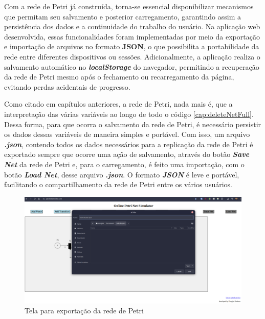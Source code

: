 \documentclass[
	12pt,				%
	openright,			%
	oneside,			%
	a4paper,			%
	english,			%
	brazil				%
	]{abntex2}
\begin{document}
Com a rede de Petri já construída, torna-se essencial disponibilizar mecanismos que permitam seu salvamento e posterior carregamento, garantindo assim a persistência dos dados e a continuidade do trabalho do usuário. Na aplicação web desenvolvida, essas funcionalidades foram implementadas por meio da exportação e importação de arquivos no formato \textbf{JSON}, o que possibilita a portabilidade da rede entre diferentes dispositivos ou sessões. Adicionalmente, a aplicação realiza o salvamento automático no \textbf{\textit{localStorage}} do navegador, permitindo a recuperação da rede de Petri mesmo após o fechamento ou recarregamento da página, evitando perdas acidentais de progresso.

Como citado em capítulos anteriores, a rede de Petri, nada mais é, que a interpretação das várias variáveis ao longo de todo o código \ref{cap:deleteNetFull}. Dessa forma, para que ocorra o salvamento da rede de Petri, é necessário persistir os dados dessas variáveis de maneira simples e portável. Com isso, um arquivo \textbf{\textit{.json}}, contendo todos os dados necessários para a replicação da rede de Petri é exportado sempre que ocorre uma ação de salvamento, através do botão \textbf{\textit{Save Net}} da rede de Petri e, para o carregamento, é feito uma importação, com o botão \textbf{\textit{Load Net}}, desse arquivo \textbf{\textit{.json}}. O formato \textbf{\textit{JSON}} é leve e portável, facilitando o compartilhamento da rede de Petri entre os vários usuários.   

\begin{figure}[ht] 
	\centering
	\includegraphics[scale=0.3]{figuras/saveNet.png}
	\caption[Tela para exportação da rede de Petri]{Tela para exportação da rede de Petri}
	\label{fig:saveNet}
\end{figure}
\FloatBarrier
\end{document}
